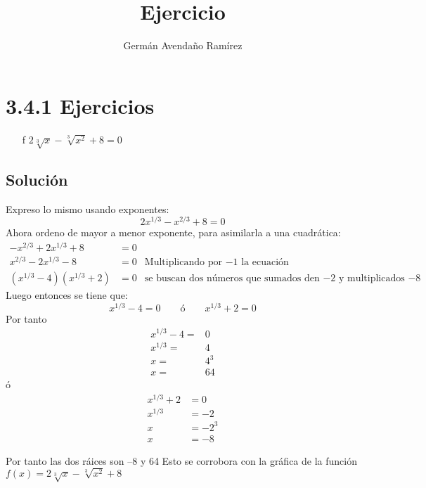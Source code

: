 \documentclass[10pt,a4paper]{article}
\author{Germán Avendaño Ramírez}
\title{Ejercicio}
\begin{document}
\section*{3.4.1 Ejercicios}
\begin{enumerate}
\item[f] $2\sqrt[3]{x}-\sqrt[3]{x^2}+8=0$
\end{enumerate}
\subsection*{Soluci\'on}
Expreso lo mismo usando exponentes:
\[2x^{1/3}-x^{2/3}+8=0\]
Ahora ordeno de mayor a menor exponente, para asimilarla a una cuadrática:
\begin{align*}
-x^{2/3}+2x^{1/3}+8&=0 &\\
x^{2/3}-2x^{1/3}-8&=0 & \mbox{Multiplicando por $-1$ la ecuación}\\
(x^{1/3}-4)(x^{1/3}+2)&=0 & \mbox{se buscan dos números que sumados den $-2$ y multiplicados $-8$}
\end{align*}
Luego entonces se tiene que:
\[x^{1/3}-4=0 \qquad \mbox{ó} \qquad x^{1/3}+2=0\]
Por tanto
\begin{align*}
x^{1/3}-4=&0\\
x^{1/3}=&4\\
x=&4^{3}\\
x=&64
\end{align*}
ó
\begin{align*}
x^{1/3}+2&=0\\
x^{1/3}&=-2\\
x&=-2^{3}\\
x&=-8
\end{align*}

Por tanto las dos ráices son --8 y 64
Esto se corrobora con la gráfica de la función $f(x)=2\sqrt[3]{x}-\sqrt[3]{x^{2}}+8$
\end{document}
